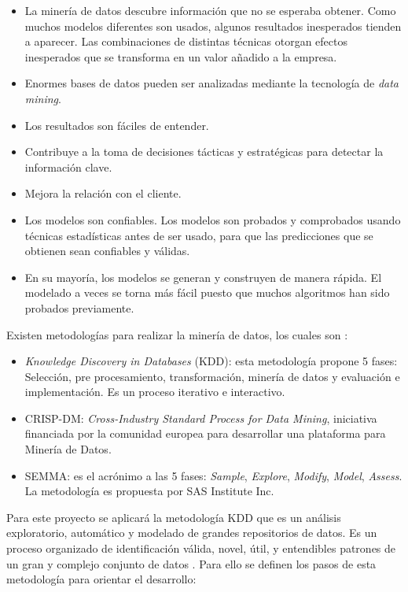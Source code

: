   \begin{itemize}
  	\item La miner\'{i}a de datos descubre informaci\'{o}n que no se esperaba obtener. Como muchos modelos diferentes son usados, algunos resultados inesperados tienden a aparecer. Las combinaciones de distintas t\'{e}cnicas otorgan efectos inesperados que se transforma en un valor a\~{n}adido a la empresa.
  	\item Enormes bases de datos pueden ser analizadas mediante la tecnolog\'{i}a de \textit{data mining}.
  	\item Los resultados son f\'{a}ciles de entender.
  	\item Contribuye a la toma de decisiones t\'{a}cticas y estrat\'{e}gicas para detectar la informaci\'{o}n clave.
  	\item Mejora la relaci\'{o}n con el cliente.
  	\item Los modelos son confiables. Los modelos son probados y comprobados usando t\'{e}cnicas estad\'{i}sticas antes de ser usado, para que las predicciones que se obtienen sean confiables y v\'{a}lidas.
  	\item En su mayor\'{i}a, los modelos se generan y construyen de manera r\'{a}pida. El modelado a veces se torna m\'{a}s f\'{a}cil puesto que muchos algoritmos han sido probados previamente. 
  \end{itemize}

  Existen metodolog\'{i}as para realizar la miner\'{i}a de datos, los cuales son \cite{30}:
  
  \begin{itemize}
  	\item \textit{Knowledge Discovery in Databases} (KDD): esta metodolog\'{i}a propone 5 fases: Selecci\'{o}n, pre procesamiento, transformaci\'{o}n, miner\'{i}a de datos y evaluaci\'{o}n e implementaci\'{o}n. Es un proceso iterativo e interactivo.
  	\item CRISP-DM: \textit{Cross-Industry Standard Process for Data Mining}, iniciativa financiada por la comunidad europea para desarrollar una plataforma para Miner\'{i}a de Datos.
  	\item SEMMA: es el acr\'{o}nimo a las 5 fases: \textit{Sample}, \textit{Explore}, \textit{Modify}, \textit{Model}, \textit{Assess}. La metodolog\'{i}a es propuesta por SAS Institute Inc.
  \end{itemize}

  Para este proyecto se aplicar\'{a} la metodolog\'{i}a KDD que es un an\'{a}lisis exploratorio, autom\'{a}tico y modelado de grandes repositorios de datos. Es un proceso organizado de identificaci\'{o}n v\'{a}lida, novel, \'{u}til, y entendibles patrones de un gran y complejo conjunto de datos \cite{31}. Para ello se definen los pasos de esta metodolog\'{i}a para orientar el desarrollo:
  
